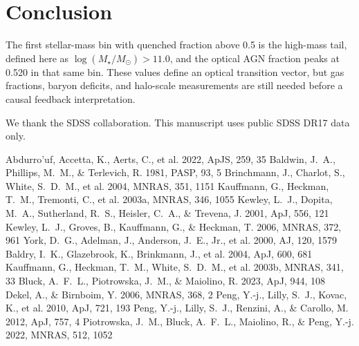 \documentclass[twocolumn]{aastex631}
\begin{document}
\section{Conclusion}\label{sec:conclusion}
The first stellar-mass bin with quenched fraction above 0.5 is the high-mass tail, defined here as $\log(M_\star/M_\odot)>11.0$, and the optical AGN fraction peaks at 0.520 in that same bin. These values define an optical transition vector, but gas fractions, baryon deficits, and halo-scale measurements are still needed before a causal feedback interpretation.

\acknowledgments
We thank the SDSS collaboration. This manuscript uses public SDSS DR17 data only.


\begin{thebibliography}{}
 Abdurro'uf, Accetta, K., Aerts, C., et al. 2022, ApJS, 259, 35
 Baldwin, J.~A., Phillips, M.~M., \& Terlevich, R. 1981, PASP, 93, 5
 Brinchmann, J., Charlot, S., White, S.~D.~M., et al. 2004, MNRAS, 351, 1151
 Kauffmann, G., Heckman, T.~M., Tremonti, C., et al. 2003a, MNRAS, 346, 1055
 Kewley, L.~J., Dopita, M.~A., Sutherland, R.~S., Heisler, C.~A., \& Trevena, J. 2001, ApJ, 556, 121
 Kewley, L.~J., Groves, B., Kauffmann, G., \& Heckman, T. 2006, MNRAS, 372, 961
 York, D.~G., Adelman, J., Anderson, J.~E., Jr., et al. 2000, AJ, 120, 1579
 Baldry, I.~K., Glazebrook, K., Brinkmann, J., et al. 2004, ApJ, 600, 681
 Kauffmann, G., Heckman, T.~M., White, S.~D.~M., et al. 2003b, MNRAS, 341, 33
 Bluck, A.~F.~L., Piotrowska, J.~M., \& Maiolino, R. 2023, ApJ, 944, 108
 Dekel, A., \& Birnboim, Y. 2006, MNRAS, 368, 2
 Peng, Y.-j., Lilly, S.~J., Kovac, K., et al. 2010, ApJ, 721, 193
 Peng, Y.-j., Lilly, S.~J., Renzini, A., \& Carollo, M. 2012, ApJ, 757, 4
 Piotrowska, J.~M., Bluck, A.~F.~L., Maiolino, R., \& Peng, Y.-j. 2022, MNRAS, 512, 1052
\end{thebibliography}
\end{document}
